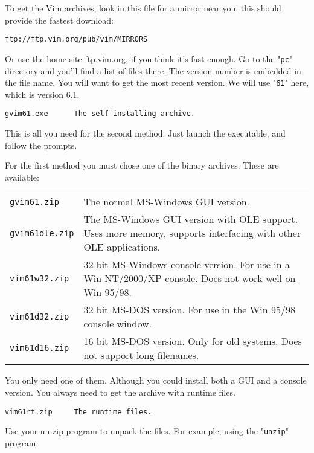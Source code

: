 To get the Vim archives, look in this file for a mirror near you, this should provide the fastest download:

\begin{Verbatim}[samepage=true]
    ftp://ftp.vim.org/pub/vim/MIRRORS 
\end{Verbatim}

Or use the home site ftp.vim.org, if you think it's fast enough.
Go to the "\verb!pc!" directory and you'll find a list of files there.
The version number is embedded in the file name.
You will want to get the most recent version.
We will use "\verb!61!" here, which is version 6.1.

\begin{Verbatim}[samepage=true]
    gvim61.exe      The self-installing archive.
\end{Verbatim}

This is all you need for the second method.
Just launch the executable, and follow the prompts.

For the first method you must chose one of the binary archives.
These are available:

\begin{center} \begin{tabularx}{\textwidth}{l X}
				\texttt{gvim61.zip} & The normal MS-Windows GUI version. \\
				\texttt{gvim61ole.zip} & The MS-Windows GUI version with OLE support.  Uses more memory, supports interfacing with other OLE applications. \\
				\texttt{vim61w32.zip} & 32 bit MS-Windows console version.  For use in a Win NT/2000/XP console.  Does not work well on Win 95/98. \\
				\texttt{vim61d32.zip} & 32 bit MS-DOS version.  For use in the Win 95/98 console window. \\
				\texttt{vim61d16.zip} & 16 bit MS-DOS version.  Only for old systems.  Does not support long filenames. \\
\end{tabularx} \end{center}

You only need one of them.
Although you could install both a GUI and a console version.
You always need to get the archive with runtime files.

\begin{Verbatim}[samepage=true]
    vim61rt.zip     The runtime files.
\end{Verbatim}

Use your un-zip program to unpack the files.
For example, using the "\verb!unzip!" program:

